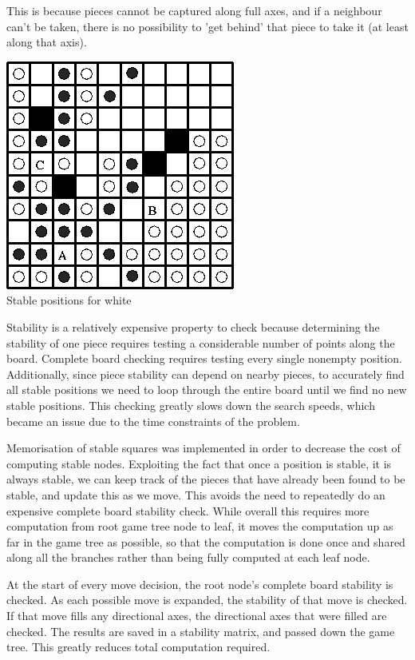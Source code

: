 \documentclass[10pt]{report}
\begin{document}
\begin{multicols}{2}
This is because pieces cannot be captured along full axes, and if a neighbour can't be taken, there is no possibility to 'get behind' that piece to take it (at least along that axis).

\begin{center}
\includegraphics[scale=0.50]{stability.PNG}\\
Stable positions for white
\end{center}

Stability is a relatively expensive property to check because determining the stability of one piece requires testing a considerable number of points along the board. Complete board checking requires testing every single nonempty position. Additionally, since piece stability can depend on nearby pieces, to accurately find all stable positions we need to loop through the entire board until we find no new stable positions. This checking greatly slows down the search speeds, which became an issue due to the time constraints of the problem.

Memorisation of stable squares was implemented in order to decrease the cost of computing stable nodes. Exploiting the fact that once a position is stable, it is always stable, we can keep track of the pieces that have already been found to be stable, and update this as we move. This avoids the need to repeatedly do an expensive complete board stability check. While overall this requires more computation from root game tree node to leaf, it moves the computation up as far in the game tree as possible, so that the computation is done once and shared along all the branches rather than being fully computed at each leaf node.

At the start of every move decision, the root node's complete board stability is checked. As each possible move is expanded, the stability of that move is checked. If that move fills any directional axes, the directional axes that were filled are checked. The results are saved in a stability matrix, and passed down the game tree. This greatly reduces total computation required.


\end{multicols}
\end{document}
